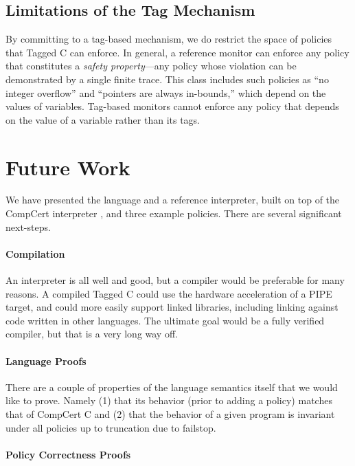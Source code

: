 \documentclass[acmsmall,review,anonymous]{acmart}\settopmatter{printfolios=true,printccs=false,printacmref=false}
\begin{document}
\subsection{Limitations of the Tag Mechanism}

By committing to a tag-based mechanism, we do restrict the space of policies that Tagged C
can enforce. In general, a reference monitor can enforce any policy that constitutes a
{\em safety property}---any policy whose violation can be demonstrated by a single finite
trace. This class includes such policies as ``no integer overflow'' and ``pointers are always in-bounds,''
which depend on the values of variables. Tag-based monitors cannot enforce any policy that
depends on the value of a variable rather than its tags.

\section{Future Work}
\label{sec:futurework}

We have presented the language and a reference interpreter, built on top of the CompCert interpreter
\cite{Leroy09:CompCert}, and three example policies. There are several significant next-steps.

\paragraph{Compilation}

An interpreter is all well and good, but a compiler would be preferable for many reasons.
A compiled Tagged C could use the hardware acceleration of a PIPE target, and could more easily
support linked libraries, including linking against code written in other languages.
The ultimate goal would be a fully verified compiler, but that is a very long way off.

\paragraph{Language Proofs}

There are a couple of properties of the language semantics itself that we would like to prove.
Namely (1) that its behavior (prior to adding a policy) matches that of CompCert C and
(2) that the behavior of a given program is invariant under all policies up to truncation due
to failstop.

\paragraph{Policy Correctness Proofs}
\end{document}
